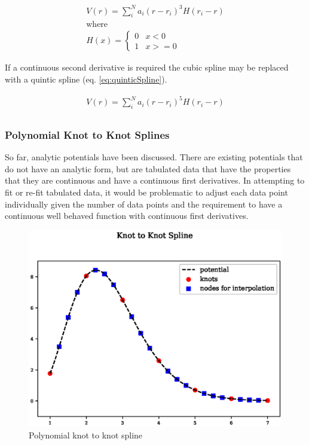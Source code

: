 \begin{equation}
\begin{split}
V(r) = \sum_i^N a_i (r - r_i)^3 H(r_i - r) \\
\text{where } \\
H(x) = \left\{ \begin{matrix} 0 & x<0 \\  1 & x >= 0 \end{matrix} \right . 
\end{split}
\label{eq:cubicSpline}
\end{equation}

If a continuous second derivative is required the cubic spline may be replaced with a quintic spline (eq. \ref{eq:quinticSpline}).

\begin{equation}
\begin{split}
V(r) = \sum_i^N a_i (r - r_i)^5 H(r_i - r) \\
\end{split}
\label{eq:quinticSpline}
\end{equation}


\subsubsection{Polynomial Knot to Knot Splines}

So far, analytic potentials have been discussed.  There are existing potentials that do not have an analytic form, but are tabulated data that have the properties that they are continuous and have a continuous first derivatives.  In attempting to fit or re-fit tabulated data, it would be problematic to adjust each data point individually given the number of data points and the requirement to have a continuous well behaved function with continuous first derivatives.

\begin{figure}[h]
  \begin{center}
    \includegraphics[scale=0.70]{chapters/background_potential_fitting/plots/spline.eps}
    \caption{Polynomial knot to knot spline}
    \label{graph:graph1}
  \end{center}
\end{figure}

